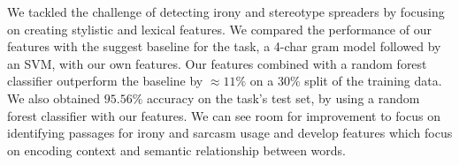 We tackled the challenge of detecting irony and stereotype spreaders by focusing on creating stylistic and lexical features. We compared the performance of our features with the suggest baseline for the task, a 4-char gram model followed by an SVM, with our own features. Our features combined with a random forest classifier outperform the baseline by $\approx 11\%$ on a $30\%$ split of the training data. We also obtained $95.56\%$ accuracy on the task's test set, by using a random forest classifier with our features. We can see room for improvement to focus on identifying passages for irony and sarcasm usage and develop features which focus on encoding context and semantic relationship between words. 